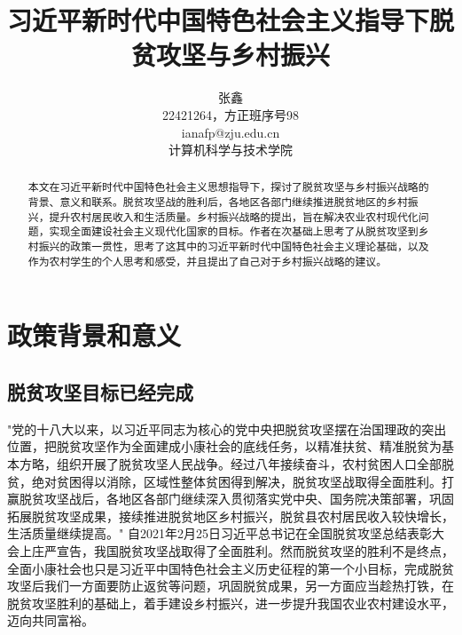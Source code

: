 \documentclass{article}
\title{习近平新时代中国特色社会主义指导下脱贫攻坚与乡村振兴}
\author{张鑫\\22421264，方正班序号98\\ianafp@zju.edu.cn\\计算机科学与技术学院\\\date{}}
\begin{document}
\setlength{\parindent}{2em} 
\maketitle
\begin{abstract}
    本文在习近平新时代中国特色社会主义思想指导下，探讨了脱贫攻坚与乡村振兴战略的背景、意义和联系。脱贫攻坚战的胜利后，各地区各部门继续推进脱贫地区的乡村振兴，提升农村居民收入和生活质量。乡村振兴战略的提出，旨在解决农业农村现代化问题，实现全面建设社会主义现代化国家的目标。作者在次基础上思考了从脱贫攻坚到乡村振兴的政策一贯性，思考了这其中的习近平新时代中国特色社会主义理论基础，以及作为农村学生的个人思考和感受，并且提出了自己对于乡村振兴战略的建议。


\end{abstract}

\section{政策背景和意义}
\subsection{脱贫攻坚目标已经完成}
"党的十八大以来，以习近平同志为核心的党中央把脱贫攻坚摆在治国理政的突出位置，把脱贫攻坚作为全面建成小康社会的底线任务，以精准扶贫、精准脱贫为基本方略，组织开展了脱贫攻坚人民战争。经过八年接续奋斗，农村贫困人口全部脱贫，绝对贫困得以消除，区域性整体贫困得到解决，脱贫攻坚战取得全面胜利。打赢脱贫攻坚战后，各地区各部门继续深入贯彻落实党中央、国务院决策部署，巩固拓展脱贫攻坚成果，接续推进脱贫地区乡村振兴，脱贫县农村居民收入较快增长，生活质量继续提高。"\cite{govcn20221011}
自2021年2月25日习近平总书记在全国脱贫攻坚总结表彰大会上庄严宣告，我国脱贫攻坚战取得了全面胜利。然而脱贫攻坚的胜利不是终点，全面小康社会也只是习近平中国特色社会主义历史征程的第一个小目标，完成脱贫攻坚后我们一方面要防止返贫等问题，巩固脱贫成果，\cite{hzau2021}另一方面应当趁热打铁，在脱贫攻坚胜利的基础上，着手建设乡村振兴，进一步提升我国农业农村建设水平，迈向共同富裕。
\end{document}
